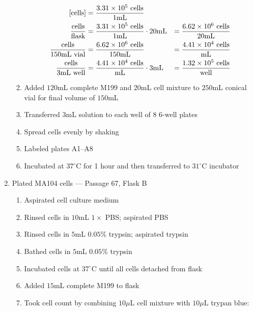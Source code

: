\begin{enumerate}
\begin{enumerate}
				\begin{align*}
				\text{[cells]} &= \frac{3.31\times 10^{5}\text{ cells}}{1\text{mL}} \\
				\frac{\text{cells}}{\text{flask}} &= \frac{3.31\times 10^{5}\text{ cells}}{1\text{mL}} \cdot 20\text{mL} &= \frac{6.62\times 10^{6}\text{ cells}}{20\text{mL}}\\
				\frac{\text{cells}}{150\text{mL vial}} &= \frac{6.62\times 10^{6}\text{ cells}}{150\text{mL}} &= \frac{4.41\times 10^{4}\text{ cells}}{\text{mL}}\\
				\frac{\text{cells}}{3\text{mL well}} &= \frac{4.41\times 10^{4}\text{ cells}}{\text{mL}} \cdot 3\text{mL} &= \frac{1.32\times 10^{5}\text{ cells}}{\text{well}}\\
				\end{align*}
			\item Added $120$mL complete M199 and $20$mL cell mixture to $250$mL conical vial for final volume of $150$mL
			\item Transferred $3$mL solution to each well of 8 6-well plates
			\item Spread cells evenly by shaking
			\item Labeled plates A1--A8
			\item Incubated at $37^{\circ}$C for 1 hour and then transferred to $31^{\circ}$C incubator
		\end{enumerate}
	\item Plated MA104 cells --- Passage 67, Flask B
		\begin{enumerate}
			\item Aspirated cell culture medium
			\item Rinsed cells in $10$mL $1\times$ PBS; aspirated PBS
			\item Rinsed cells in $5$mL $0.05$\% trypsin; aspirated trypsin
			\item Bathed cells in $5$mL $0.05$\% trypsin
			\item Incubated cells at $37^{\circ}$C until all cells detached from flask
			\item Added $15$mL complete M199 to flask
			\item Took cell count by combining $10\mu$L cell mixture with $10\mu$L trypan blue:
			

\end{enumerate}
\end{enumerate}
